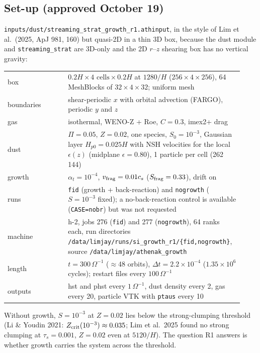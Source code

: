 \documentclass[11pt]{article}
\newcommand{\code}[1]{\texttt{#1}}
\newcommand{\file}[1]{\texttt{\small #1}}
\newcommand{\St}{S}
\newcommand{\vf}{v_{\rm frag}}
\begin{document}
\subsection{Set-up (approved October 19)}
\file{inputs/dust/streaming\_strat\_growth\_r1.athinput}, in the style of Lim et al.\
(2025, ApJ 981, 160) but quasi-2D in a thin 3D box, because the dust module and
\code{streaming\_strat} are 3D-only and the 2D $r$--$z$ shearing box has no vertical
gravity:
\begin{longtable}{>{\raggedright\arraybackslash}p{0.25\linewidth}p{0.68\linewidth}}
\toprule
box & $0.2H\times4\text{ cells}\times0.2H$ at $1280/H$ ($256\times4\times256$), 64
  MeshBlocks of $32\times4\times32$; uniform mesh \\
boundaries & shear-periodic $x$ with orbital advection (FARGO), periodic $y$ and $z$ \\
gas & isothermal, WENO-Z + Roe, $C=0.3$, imex2+ drag \\
dust & $\Pi=0.05$, $Z=0.02$, one species, $\St_0=10^{-3}$, Gaussian layer
  $H_{p0}=0.025H$ with NSH velocities for the local $\epsilon(z)$ (midplane
  $\epsilon=0.80$), 1 particle per cell (262\,144) \\
growth & $\alpha_t=10^{-4}$, $\vf=0.01c_s$ ($\St_{\rm frag}=0.33$), drift on \\
runs & \code{fid} (growth + back-reaction) and \code{nogrowth} ($\St=10^{-3}$ fixed); a
  no-back-reaction control is available (\code{CASE=nobr}) but was not requested \\
machine & h-2, jobs 276 (\code{fid}) and 277 (\code{nogrowth}), 64 ranks each, run
  directories \file{/data/limjay/runs/si\_growth\_r1/\{fid,nogrowth\}}, source
  \file{/data/limjay/athenak\_growth} \\
length & $t=300\,\Omega^{-1}$ ($\approx$48 orbits), $\Delta t=2.2\times10^{-4}$
  ($1.35\times10^6$ cycles); restart files every $100\,\Omega^{-1}$ \\
outputs & hst and phst every $1\,\Omega^{-1}$, dust density every 2, gas every 20,
  particle VTK with \code{ptaus} every 10 \\
\bottomrule
\end{longtable}
Without growth, $\St=10^{-3}$ at $Z=0.02$ lies below the strong-clumping threshold
(Li \& Youdin 2021: $Z_{\rm crit}(10^{-3})\approx0.035$; Lim et al.\ 2025 found no strong
clumping at $\tau_s=0.001$, $Z=0.02$ even at $5120/H$). The question R1 answers is
whether growth carries the system across the threshold.
\end{document}
